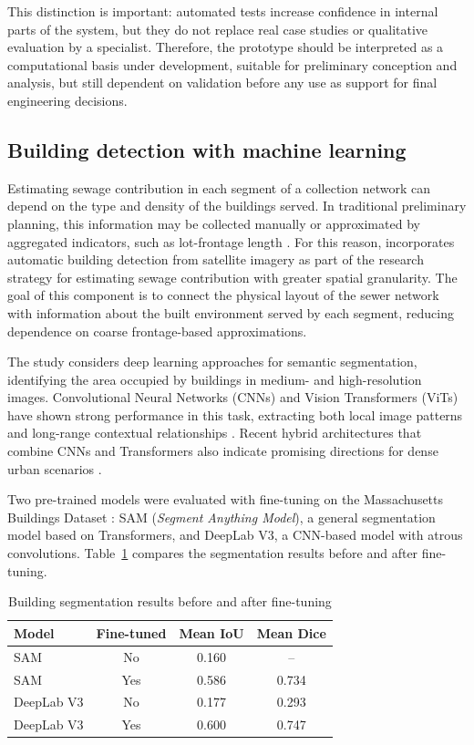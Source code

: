 This distinction is important: automated tests increase confidence in internal parts of the system, but they do not replace real case studies or qualitative evaluation by a specialist.
Therefore, the prototype should be interpreted as a computational basis under development, suitable for preliminary conception and analysis, but still dependent on validation before any use as support for final engineering decisions.

\subsection{Building detection with machine learning}

Estimating sewage contribution in each segment of a collection network can depend on the type and density of the buildings served.
In traditional preliminary planning, this information may be collected manually or approximated by aggregated indicators, such as lot-frontage length \cite{rodrigues2020}.
For this reason, \method incorporates automatic building detection from satellite imagery as part of the research strategy for estimating sewage contribution with greater spatial granularity.
The goal of this component is to connect the physical layout of the sewer network with information about the built environment served by each segment, reducing dependence on coarse frontage-based approximations.

The study considers deep learning approaches for semantic segmentation, identifying the area occupied by buildings in medium- and high-resolution images.
Convolutional Neural Networks (CNNs) and Vision Transformers (ViTs) have shown strong performance in this task, extracting both local image patterns and long-range contextual relationships \cite{alidoost2018cnn,dosovitskiy2021imageworth16x16words}.
Recent hybrid architectures that combine CNNs and Transformers also indicate promising directions for dense urban scenarios \cite{zhang2024building,zhou2024hierarchical}.

Two pre-trained models were evaluated with fine-tuning on the Massachusetts Buildings Dataset \cite{MassachusettsBuildingsDataset}: SAM (\textit{Segment Anything Model}), a general segmentation model based on Transformers, and DeepLab V3, a CNN-based model with atrous convolutions.
Table~\ref{tab:seg_results} compares the segmentation results before and after fine-tuning.

\begin{table}[ht]
\centering
\caption{Building segmentation results before and after fine-tuning}
\label{tab:seg_results}
\begin{tabular}{lccc}
\hline
\textbf{Model} & \textbf{Fine-tuned} & \textbf{Mean IoU} & \textbf{Mean Dice} \\
\hline
SAM        & No  & 0.160 & --    \\
SAM        & Yes & 0.586 & 0.734 \\
DeepLab V3 & No  & 0.177 & 0.293 \\
DeepLab V3 & Yes & 0.600 & 0.747 \\
\hline
\end{tabular}
\end{table}

